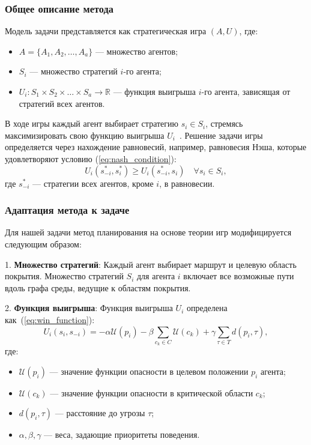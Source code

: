 \subsubsection*{Общее описание метода}
Модель задачи представляется как стратегическая игра $(A, U)$, где:  
\begin{itemize}
	\item $A = \{A_1, A_2, \dots, A_a\}$ — множество агентов;
	\item $S_i$ — множество стратегий $i$-го агента;
	\item $U_i: S_1 \times S_2 \times \dots \times S_a \to \mathbb{R}$ — функция выигрыша $i$-го агента, зависящая от стратегий всех агентов.
\end{itemize}

В ходе игры каждый агент выбирает стратегию $s_i \in S_i$, стремясь максимизировать свою функцию выигрыша $U_i$~\cite{parsons2002gametheory}.
Решение задачи игры определяется через нахождение равновесий, например, равновесия Нэша, которые удовлетворяют условию (\ref{eq:nash_condition}):  
\begin{equation}
	\label{eq:nash_condition}
	U_i(s_{-i}^*, s_i^*) \geq U_i(s_{-i}^*, s_i) \quad \forall s_i \in S_i,
\end{equation}
где $s_{-i}^*$ — стратегии всех агентов, кроме $i$, в равновесии.

\subsubsection*{Адаптация метода к задаче}
Для нашей задачи метод планирования на основе теории игр модифицируется следующим образом:  

1. \textbf{Множество стратегий}:
Каждый агент выбирает маршрут и целевую область покрытия.
Множество стратегий $S_i$ для агента $i$ включает все возможные пути вдоль графа среды, ведущие к областям покрытия.  

2. \textbf{Функция выигрыша}:  
Функция выигрыша $U_i$ определена как~(\ref{eq:win_function}):
\begin{equation}
	\label{eq:win_function}
	U_i(s_i, s_{-i}) = - \alpha \mathcal{U}(p_i) - \beta \sum_{c_k \in C} \mathcal{U}(c_k) + \gamma \sum_{\tau \in T} d(p_i, \tau),
\end{equation}
где:
\begin{itemize}
	\item $\mathcal{U}(p_i)$ — значение функции опасности в целевом положении $p_i$ агента;
	\item $\mathcal{U}(c_k)$ — значение функции опасности в критической области $c_k$;
	\item $d(p_i, \tau)$ — расстояние до угрозы $\tau$;
	\item $\alpha, \beta, \gamma$ — веса, задающие приоритеты поведения.
\end{itemize}

